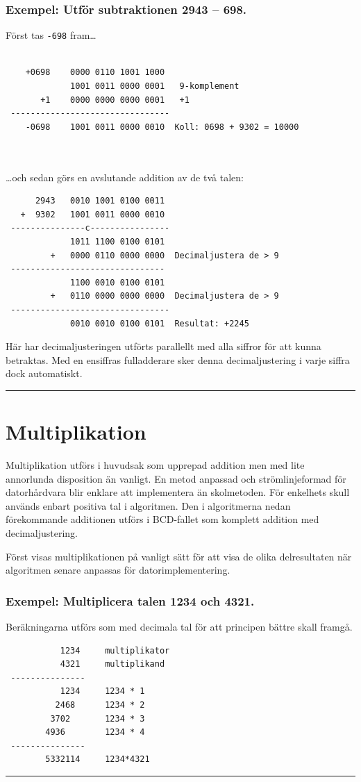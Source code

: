 \documentclass[oneside,10pt,a4paper,swedish]{scrbook}
\newcommand{\startex}[1]{\subsubsection{Exempel: #1}}
\newcommand{\slutex}{\vspace{-8mm}\begin{flushright} \rule{1ex}{1ex} \end{flushright}}
\newcommand{\asm}[1]{\texttt{#1}}
\begin{document}
\startex{Utför subtraktionen 2943 -- 698.}
Först tas \asm{-698} fram\ldots
\begin{center}
\begin{lstlisting}
  
    +0698    0000 0110 1001 1000
             1001 0011 0000 0001   9-komplement
       +1    0000 0000 0000 0001   +1
 --------------------------------
    -0698    1001 0011 0000 0010  Koll: 0698 + 9302 = 10000
 
 
 \end{lstlisting}
\end{center}
\ldots och sedan görs en avslutande addition av de två talen:
\begin{center}
\begin{lstlisting}
      2943   0010 1001 0100 0011
   +  9302   1001 0011 0000 0010 
 ---------------c----------------
             1011 1100 0100 0101
         +   0000 0110 0000 0000  Decimaljustera de > 9
 -------------------------------
             1100 0010 0100 0101           
         +   0110 0000 0000 0000  Decimaljustera de > 9
 --------------------------------
             0010 0010 0100 0101  Resultat: +2245
\end{lstlisting}
\end{center}

Här har decimaljusteringen utförts parallellt med alla siffror för att kunna betraktas. Med en ensiffras fulladderare sker denna decimaljustering i varje siffra dock automatiskt.

\slutex


\section{Multiplikation} Multiplikation utförs i huvudsak som upprepad addition men med lite annorlunda disposition än vanligt. En metod anpassad och strömlinjeformad för datorhårdvara blir enklare att implementera än skolmetoden. För enkelhets skull används enbart positiva tal i algoritmen. Den i algoritmerna nedan förekommande additionen utförs i BCD-fallet som komplett addition med decimaljustering.

Först visas multiplikationen på vanligt sätt för att visa de olika del\-resultaten när algoritmen senare anpassas för datorimplementering.

\startex{Multiplicera talen 1234 och 4321.}

Beräkningarna utförs som med decimala tal för att principen bättre skall framgå.

\begin{center}
\begin{lstlisting}
           1234	    multiplikator
           4321     multiplikand
 ---------------
           1234     1234 * 1
          2468      1234 * 2
         3702       1234 * 3
        4936        1234 * 4
 ---------------
        5332114     1234*4321
\end{lstlisting}
\end{center}
\slutex
\end{document}

